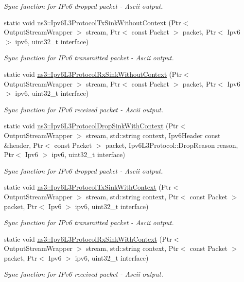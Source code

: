 \begin{DoxyCompactItemize}
\begin{DoxyCompactList}\small\item\em Sync function for I\+Pv6 dropped packet -\/ Ascii output. \end{DoxyCompactList}\item 
static void \hyperlink{namespacens3_afefdbba2df6c6e8aaaf8cd04d4c65ed8}{ns3\+::\+Ipv6\+L3\+Protocol\+Tx\+Sink\+Without\+Context} (Ptr$<$ Output\+Stream\+Wrapper $>$ stream, Ptr$<$ const Packet $>$ packet, Ptr$<$ Ipv6 $>$ ipv6, uint32\+\_\+t interface)
\begin{DoxyCompactList}\small\item\em Sync function for I\+Pv6 transmitted packet -\/ Ascii output. \end{DoxyCompactList}\item 
static void \hyperlink{namespacens3_afebee98eb19d40184517bb4806b90130}{ns3\+::\+Ipv6\+L3\+Protocol\+Rx\+Sink\+Without\+Context} (Ptr$<$ Output\+Stream\+Wrapper $>$ stream, Ptr$<$ const Packet $>$ packet, Ptr$<$ Ipv6 $>$ ipv6, uint32\+\_\+t interface)
\begin{DoxyCompactList}\small\item\em Sync function for I\+Pv6 received packet -\/ Ascii output. \end{DoxyCompactList}\item 
static void \hyperlink{namespacens3_a4c8acaeda2989dceadb214af568d89a1}{ns3\+::\+Ipv6\+L3\+Protocol\+Drop\+Sink\+With\+Context} (Ptr$<$ Output\+Stream\+Wrapper $>$ stream, std\+::string context, Ipv6\+Header const \&header, Ptr$<$ const Packet $>$ packet, Ipv6\+L3\+Protocol\+::\+Drop\+Reason reason, Ptr$<$ Ipv6 $>$ ipv6, uint32\+\_\+t interface)
\begin{DoxyCompactList}\small\item\em Sync function for I\+Pv6 dropped packet -\/ Ascii output. \end{DoxyCompactList}\item 
static void \hyperlink{namespacens3_aaf7b2964128423d1fa02e622009b0e04}{ns3\+::\+Ipv6\+L3\+Protocol\+Tx\+Sink\+With\+Context} (Ptr$<$ Output\+Stream\+Wrapper $>$ stream, std\+::string context, Ptr$<$ const Packet $>$ packet, Ptr$<$ Ipv6 $>$ ipv6, uint32\+\_\+t interface)
\begin{DoxyCompactList}\small\item\em Sync function for I\+Pv6 transmitted packet -\/ Ascii output. \end{DoxyCompactList}\item 
static void \hyperlink{namespacens3_a694eb22660f7c8a45732d834395e3900}{ns3\+::\+Ipv6\+L3\+Protocol\+Rx\+Sink\+With\+Context} (Ptr$<$ Output\+Stream\+Wrapper $>$ stream, std\+::string context, Ptr$<$ const Packet $>$ packet, Ptr$<$ Ipv6 $>$ ipv6, uint32\+\_\+t interface)
\begin{DoxyCompactList}\small\item\em Sync function for I\+Pv6 received packet -\/ Ascii output. \end{DoxyCompactList}\end{DoxyCompactItemize}
